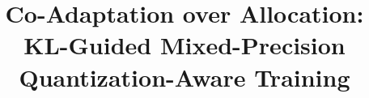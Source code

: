 \documentclass[conference]{IEEEtran}
\makeatletter
\providecommand{\linebreakand}{%
  \end{@IEEEauthorhalign}
  \hfill\mbox{}\par
  \mbox{}\hfill\begin{@IEEEauthorhalign}}
\makeatother
\begin{document}
\title{Co-Adaptation over Allocation: KL-Guided Mixed-Precision Quantization-Aware Training}

\author{}



\maketitle
\end{document}
